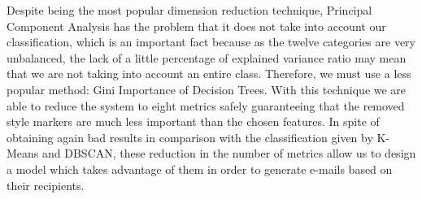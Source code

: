 Despite being the most popular dimension reduction technique, Principal Component Analysis has the problem that it does not take into account our classification, which is an important fact because as the twelve categories are very unbalanced, the lack of a little percentage of explained variance ratio may mean that we are not taking into account an entire class. Therefore, we must use a less popular method: Gini Importance of Decision Trees. With this technique we are able to reduce the system to eight metrics safely guaranteeing that the removed style markers are much less important than the chosen features. In spite of obtaining again bad results in comparison with the classification given by K-Means and DBSCAN, these reduction in the number of metrics allow us to design a model which takes advantage of them in order to generate e-mails based on their recipients.